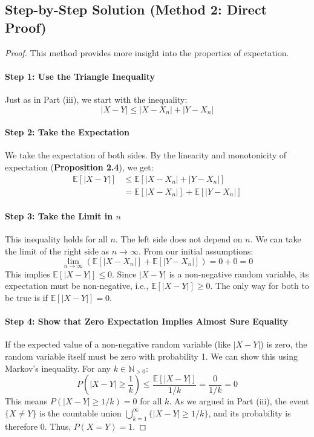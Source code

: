 \documentclass[11pt,a4paper]{article}
\theoremstyle{exercise}
\begin{document}
\subsection*{Step-by-Step Solution (Method 2: Direct Proof)}
\begin{proof}
This method provides more insight into the properties of expectation.
\paragraph{Step 1: Use the Triangle Inequality}
Just as in Part (iii), we start with the inequality:
\[
|X - Y| \le |X - X_n| + |Y - X_n|
\]
\paragraph{Step 2: Take the Expectation}
We take the expectation of both sides. By the linearity and monotonicity of expectation (\textbf{Proposition 2.4}), we get:
\begin{align*}
\mathbb{E}[|X - Y|] &\le \mathbb{E}[|X - X_n| + |Y - X_n|] \\
&= \mathbb{E}[|X - X_n|] + \mathbb{E}[|Y - X_n|]
\end{align*}
\paragraph{Step 3: Take the Limit in $n$}
This inequality holds for all $n$. The left side does not depend on $n$. We can take the limit of the right side as $n \to \infty$. From our initial assumptions:
\[
\lim_{n \to \infty} \left( \mathbb{E}[|X - X_n|] + \mathbb{E}[|Y - X_n|] \right) = 0 + 0 = 0
\]
This implies $\mathbb{E}[|X - Y|] \le 0$. Since $|X - Y|$ is a non-negative random variable, its expectation must be non-negative, i.e., $\mathbb{E}[|X - Y|] \ge 0$.
The only way for both to be true is if $\mathbb{E}[|X - Y|] = 0$.

\paragraph{Step 4: Show that Zero Expectation Implies Almost Sure Equality}
If the expected value of a non-negative random variable (like $|X - Y|$) is zero, the random variable itself must be zero with probability 1. We can show this using Markov's inequality. For any $k \in \mathbb{N}_{>0}$:
\[
P\left(|X - Y| \ge \frac{1}{k}\right) \le \frac{\mathbb{E}[|X - Y|]}{1/k} = \frac{0}{1/k} = 0
\]
This means $P(|X - Y| \ge 1/k) = 0$ for all $k$. As we argued in Part (iii), the event $\{X \neq Y\}$ is the countable union $\bigcup_{k=1}^{\infty} \{|X - Y| \ge 1/k\}$, and its probability is therefore 0. Thus, $P(X = Y) = 1$.
\end{proof}
\newpage
\end{document}
